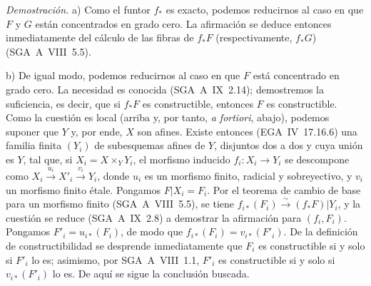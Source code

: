 \emph{Demostración.} a) Como el funtor $f_{*}$ es exacto, podemos reducirnos al caso en que $F$ y $G$ están concentrados en grado cero. La afirmación se deduce entonces inmediatamente del cálculo de las fibras de $f_{*}F$ (respectivamente, $f_{*}G$) (SGA~A~VIII~5.5).

b) De igual modo, podemos reducirnos al caso en que $F$ está concentrado en grado cero. La necesidad es conocida (SGA~A~IX~2.14); demostremos la suficiencia, es decir, que si $f_{*}F$ es constructible, entonces $F$ es constructible. Como la cuestión es local (arriba y, por tanto, \emph{a fortiori}, abajo), podemos suponer que $Y$ y, por ende, $X$ son afines. Existe entonces (EGA~IV~17.16.6) una familia finita $(Y_i)$ de subesquemas afines de $Y$, disjuntos dos a dos y cuya unión es $Y$, tal que, si $X_i = X \times_Y Y_i$, el morfismo inducido $f_i : X_i \to Y_i$ se descompone como $X_i \xrightarrow{u_i} X'_i \xrightarrow{v_i} Y_i$, donde $u_i$ es un morfismo finito, radicial y sobreyectivo, y $v_i$ un morfismo finito étale. Pongamos $F|X_i = F_i$. Por el teorema de cambio de base para un morfismo finito (SGA~A~VIII~5.5), se tiene $f_{i*}(F_i) \xrightarrow{\sim} (f_{*}F)|Y_i$, y la cuestión se reduce (SGA~A~IX~2.8) a demostrar la afirmación para $(f_i, F_i)$. Pongamos $F'_i = u_{i*}(F_i)$, de modo que $f_{i*}(F_i) = v_{i*}(F'_i)$. De la definición de constructibilidad se desprende inmediatamente que $F_i$ es constructible si y solo si $F'_i$ lo es; asimismo, por SGA~A~VIII~1.1, $F'_i$ es constructible si y solo si $v_{i*}(F'_i)$ lo es. De aquí se sigue la conclusión buscada.
